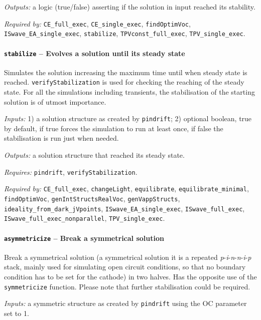		\textit{Outputs:} a logic (true/false) asserting if the solution in input reached its stability.

		\textit{Required by:} \texttt{CE\_full\_exec}, \texttt{CE\_single\_exec}, \texttt{find\-Optim\-Voc}, \texttt{IS\-wave\_EA\_single\_exec}, \texttt{stabilize}, \texttt{TPV\-const\_full\_exec}, \texttt{TPV\_single\_exec}.

		\paragraph{\texttt{stabilize} -- Evolves a solution until its steady state}
		Simulates the solution increasing the maximum time until when steady state is reached.
		\texttt{verify\-Stabilization} is used for checking the reaching of the steady state.
		For all the simulations including transients, the stabilisation of the starting solution is of utmost importance.

		\textit{Inputs:} 1) a solution structure as created by \texttt{pin\-drift};
		2) optional boolean, true by default,
		if true forces the simulation to run at least once, if false the
		stabilisation is run just when needed.

		\textit{Outputs:} a solution structure that reached its steady state.

		\textit{Requires:} \texttt{pin\-drift}, \texttt{verify\-Stabilization}.

		\textit{Required by:} \texttt{CE\_full\_exec}, \texttt{change\-Light}, \texttt{equilibrate}, \texttt{equilibrate\_minimal}, \texttt{find\-Optim\-Voc}, \texttt{gen\-Int\-Structs\-Real\-Voc}, \texttt{gen\-Vapp\-Structs}, \texttt{ideality\_from\_dark\_jVpoints}, \texttt{IS\-wave\_EA\_single\_exec}, \texttt{IS\-wave\_full\_exec}, \texttt{IS\-wave\_full\_exec\_nonparallel}, \texttt{TPV\_single\_exec}.

		\paragraph{\texttt{asymmetricize} -- Break a symmetrical solution}\label{asymmetricize}
		Break a symmetrical solution (a symmetrical solution it is a repeated \textit{p}-\textit{i}-\textit{n}-\textit{n}-\textit{i}-\textit{p} stack, mainly used for simulating open circuit conditions, so that no boundary condition has to be set for the cathode) in two halves. Has the opposite use of the \texttt{symmetricize} function.
		Please note that further stabilisation could be required.

		\textit{Inputs:} a symmetric structure as created by \texttt{pin\-drift} using the OC parameter set to 1.

